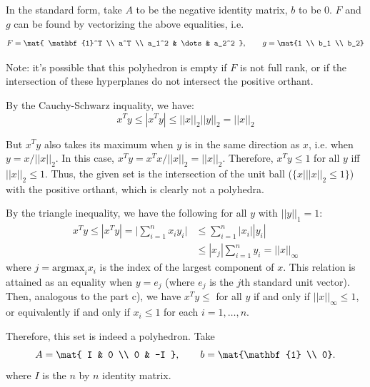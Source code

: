 \documentclass{homework}
\begin{document}
\begin{letterenum}
In the standard form, take $A$ to be the negative identity matrix, $b$ to be 0. $F$ and $g$
can be found by vectorizing the above equalities, i.e.
\begin{equation*}
    F = \mat{
        \mathbf{1}^T \\
        a^T \\
        a_1^2 & \dots & a_2^2
    }, \qquad g = \mat{1 \\ b_1 \\ b_2}
\end{equation*}

Note: it's possible that this polyhedron is empty if $F$ is not full rank, or if the
intersection of these hyperplanes do not intersect the positive orthant. 

\item By the Cauchy-Schwarz inquality, we have:
\begin{equation*}
    x^T y \leq |x^T y| \leq ||x||_2 ||y||_2 = ||x||_2
\end{equation*}

But $x^T y$ also takes its maximum when $y$ is in the same direction as $x$, i.e. when $y = x / ||x||_2$.
In this case, $x^T y = x^T x / ||x||_2 = ||x||_2$. Therefore, $x^T y \leq 1$ for all $y$ iff $||x||_2 \leq 1$.
Thus, the given set is the intersection of the
unit ball ($\{x | ||x||_2 \leq 1\}$) with the positive orthant, which is clearly not a polyhedra.

\item By the triangle inequality, we have the following for all $y$ with $||y||_1 = 1$:
\begin{align*}
    x^T y \leq |x^T y | = \biggl| \sum_{i=1}^n x_i y_i \biggr| &\leq \sum_{i=1}^{n} |x_i | |y_i| \\
        &\leq |x_j| \sum_{i=1}^{n} y_i = ||x||_{\infty}
\end{align*}
where $j = \text{argmax}_i x_i$ is the index of the largest component of $x$. This relation is
attained as an equality when $y=e_j$ (where $e_j$ is the $j$th standard unit vector).
Then, analogous to the part c), we have $x^T y \leq $ for all $y$ if and only if $||x||_{\infty} \leq 1$,
or equivalently if and only if $x_i \leq 1$ for each $i=1,\dots,n$.

Therefore, this set is indeed a polyhedron. Take
\begin{equation*}
    A = \mat{
        I & 0 \\
        0 & -I
    }, \qquad b = \mat{\mathbf{1} \\ 0}.
\end{equation*}
where $I$ is the $n$ by $n$ identity matrix.


\end{letterenum}
\end{document}
